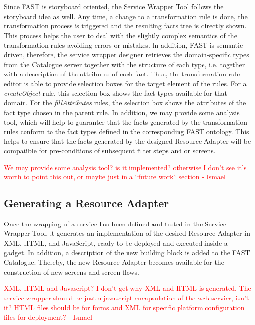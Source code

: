 \documentclass{fast_latex}
\begin{document}
Since FAST is storyboard oriented, the Service Wrapper Tool follows the storyboard idea as well. Any time, a change to a transformation rule is done, the transformation process is triggered and the resulting facts tree is directly shown. This process helps the user to deal with the slightly complex semantics of the transformation rules avoiding errors or mistakes. In addition, FAST is semantic-driven, therefore, the service wrapper designer retrieves the domain-specific types from the Catalogue server together with the structure of each type, i.e. together with a description of the attributes of each fact. Thus, the transformation rule editor is able to provide selection boxes for the target element of the rules. For a \emph{createObject} rule, this selection box shows the fact types available for that domain. For the \emph{fillAttributes} rules, the selection box shows the attributes of the fact type chosen in the parent rule. In addition, we may provide some analysis tool, which will help to guarantee that the facts generated by the transformation rules conform to the fact types defined in the corresponding FAST ontology. This helps to ensure that the facts generated by the designed Resource Adapter will be compatible for pre-conditions of subsequent filter steps and or screens.

\textcolor{red}{We may provide some analysis tool? is it implemented? otherwise I don't see it's worth to point this out, or maybe just in a ``future work'' section - Ismael}



\subsection{Generating a Resource Adapter} %
\label{sub:generating_a_resource_adapter}

Once the wrapping of a service has been defined and tested in the Service Wrapper Tool, it generates an implementation of the desired Resource Adapter in XML, HTML, and JavaScript, ready to be deployed and executed inside a gadget. In addition, a description of the new building block is added to the FAST Catalogue. Thereby, the new Resource Adapter becomes available for the construction of new screens and screen-flows.

\textcolor{red}{XML, HTML and Javascript? I don't get why XML and HTML is generated. The service wrapper should be just a javascript encapsulation of the web service, isn't it? HTML files should be for forms and XML for specific platform configuration files for deployment? - Ismael}
\end{document}
